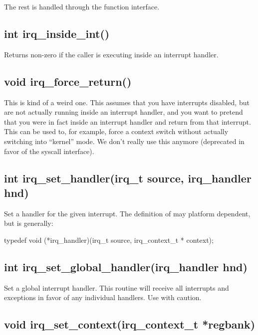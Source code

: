 \documentclass[english]{report}
\newenvironment{lyxcode}
   {\begin{list}{}{
     \setlength{\rightmargin}{\leftmargin}
     \raggedright
     \setlength{\itemsep}{0pt}
     \setlength{\parsep}{0pt}
     \normalfont\ttfamily}%
    \item[]}
   {\end{list}}
\begin{document}
The rest is handled through the function interface.


\subsection{int irq\_inside\_int()}

Returns non-zero if the caller is executing inside an interrupt handler.


\subsection{void irq\_force\_return()}

This is kind of a weird one. This assumes that you have interrupts
disabled, but are not actually running inside an interrupt handler,
and you want to pretend that you were in fact inside an interrupt
handler and return from that interrupt. This can be used to, for example,
force a context switch without actually switching into ``kernel''
mode. We don't really use this anymore (deprecated in favor of the
syscall interface).


\subsection{int irq\_set\_handler(irq\_t source, irq\_handler hnd)}

Set a handler for the given interrupt. The definition of 
may platform dependent, but is generally:

\begin{lyxcode}
typedef void (*irq\_handler)(irq\_t source, irq\_context\_t * context);
\end{lyxcode}


\subsection{int irq\_set\_global\_handler(irq\_handler hnd)}

Set a global interrupt handler. This routine will receive all interrupts
and exceptions in favor of any individual handlers. Use with caution.


\subsection{void irq\_set\_context(irq\_context\_t *regbank)}
\end{document}
